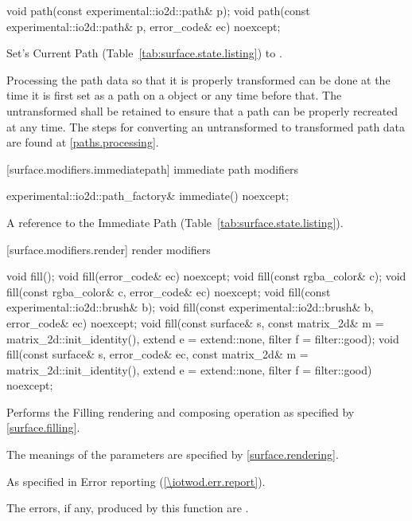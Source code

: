 \begin{itemdecl}
void path(const experimental::io2d::path& p);
void path(const experimental::io2d::path& p, error_code& ec) noexcept;
\end{itemdecl}
\begin{itemdescr}
\pnum
\effects
Set's Current Path (Table~\ref{tab:surface.state.listing}) to .

\pnum
\remarks
Processing the path data so that it is properly transformed can be done at the time it is first set as a path on a  object or any time before that. The untransformed  shall be retained to ensure that a path can be properly recreated at any time. The steps for converting an untransformed  to transformed path data are found at \ref{paths.processing}.
\end{itemdescr}

 [surface.modifiers.immediatepath] { immediate path modifiers}

\begin{itemdecl}
experimental::io2d::path_factory& immediate() noexcept;
\end{itemdecl}
\begin{itemdescr}
\pnum
\returns
A reference to the Immediate Path (Table~\ref{tab:surface.state.listing}).
\end{itemdescr}

 [surface.modifiers.render] { render modifiers}

\begin{itemdecl}
void fill();
void fill(error_code& ec) noexcept;
void fill(const rgba_color& c);
void fill(const rgba_color& c, error_code& ec) noexcept;
void fill(const experimental::io2d::brush& b);
void fill(const experimental::io2d::brush& b, error_code& ec) noexcept;
void fill(const surface& s, const matrix_2d& m = matrix_2d::init_identity(), 
  extend e = extend::none, filter f = filter::good);
void fill(const surface& s, error_code& ec,
  const matrix_2d& m = matrix_2d::init_identity(), extend e = extend::none, 
  filter f = filter::good) noexcept;
\end{itemdecl}
\begin{itemdescr}
\pnum
\effects
Performs the Filling rendering and composing operation as specified by \ref{surface.filling}.

\pnum
The meanings of the parameters are specified by \ref{surface.rendering}.

\pnum
\throws
As specified in Error reporting (\ref{\iotwod.err.report}).

\pnum
\errors
The errors, if any, produced by this function are .
\end{itemdescr}

